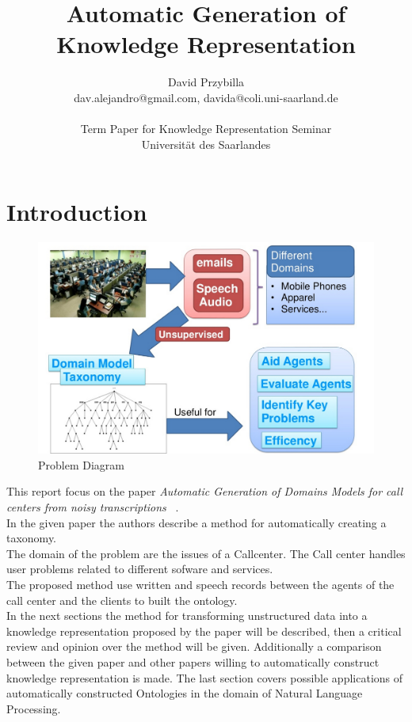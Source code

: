 \documentclass[4pt,a4paper,twocolumn]{article}
\author{David Przybilla\\dav.alejandro@gmail.com, davida@coli.uni-saarland.de\\ \\ Term Paper for Knowledge Representation Seminar\\ Universit\"{a}t des Saarlandes}
\title{Automatic Generation of Knowledge Representation}
\begin{document}
\twocolumn[
	 \begin{@twocolumnfalse}
    \maketitle
  \end{@twocolumnfalse}
 ]




\section{Introduction}


\begin{figure}[]
  \centering
    \includegraphics[scale=0.2]{pics/problem.jpg}
    \caption{Problem Diagram}
   \label{fig:problem}  
\end{figure}

This report focus on the paper \textit{Automatic Generation of Domains Models for call centers from noisy transcriptions} ~\cite{Roy:2006:AGD:1220175.1220268}.\\
In the given paper the authors describe a method for automatically creating a taxonomy.\\
The domain of the problem are the issues of a Callcenter. The Call center handles user problems related to different sofware and services.\\
The proposed method use  written and speech records between the agents of the call center and the clients to built the ontology. \\
In the next sections  the method for transforming unstructured data into a knowledge representation proposed by the paper will be described,
then a critical review and opinion over the method will be given. Additionally a comparison between the given paper and other papers willing to automatically construct knowledge representation is made.
The last section covers  possible applications of automatically constructed Ontologies in the domain of Natural Language Processing.
\end{document}

